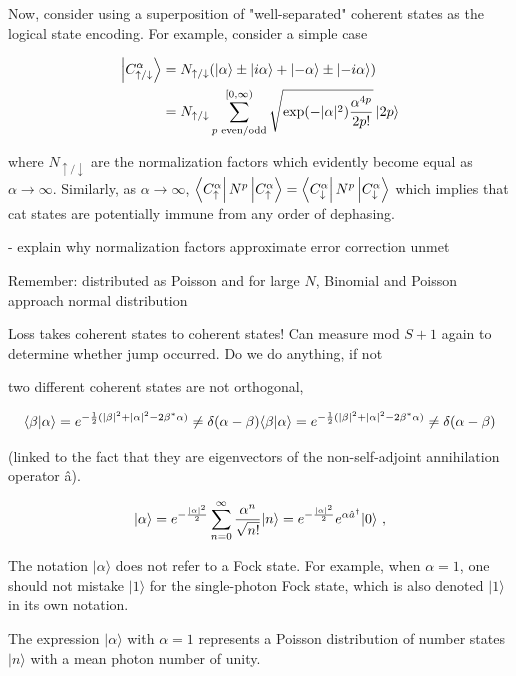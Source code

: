 \documentclass[12]{amsart}
\newcommand\0{\mathbf{0}}
\newcommand\<{\langle}
\renewcommand\>{\rangle}
\begin{document}
Now, consider using a superposition of "well-separated" coherent states as the logical state encoding. For example, consider a simple case

\begin{align*}
\ket{C^\alpha_{\uparrow/\downarrow}} &= N_{\uparrow /\downarrow} (\ket{\alpha} \pm \ket{i \alpha} + \ket{-\alpha} \pm \ket{-i \alpha}) \\
&= N_{\uparrow /\downarrow} \sum_{p\text{ even/odd}}^{[0, \infty)}\sqrt{\exp(-|\alpha|^2)\frac{
\alpha^{4p}}{2p!}}\ket{2p}
\end{align*}

where $N_{\uparrow /\downarrow}$ are the normalization factors which evidently become equal as $\alpha \rightarrow \infty$. Similarly, as $\alpha \rightarrow \infty$, $\bra{C^\alpha_{\uparrow}} N^p \ket{C^\alpha_{\uparrow}} = \bra{C^\alpha_{\downarrow}} N^p \ket{C^\alpha_{\downarrow}}$ which implies that cat states are potentially immune from any order of dephasing.

- explain why normalization factors approximate error correction unmet

Remember: distributed as Poisson and for large $N$, Binomial and Poisson approach normal distribution

Loss takes coherent states to coherent states! Can measure mod $S+1$ again to determine whether jump occurred. Do we do anything, if not


two different coherent states are not orthogonal,

$$
{\displaystyle \langle \beta |\alpha \rangle =e^{-{1 \over 2}(|\beta |^{2}+|\alpha |^{2}-2\beta ^{*}\alpha )}\neq \delta (\alpha -\beta )} \langle\beta|\alpha\rangle=e^{-{1\over2}(|\beta|^2+|\alpha|^2-2\beta^*\alpha)}\neq\delta(\alpha-\beta)
$$

(linked to the fact that they are eigenvectors of the non-self-adjoint annihilation operator â).

$$
|\alpha\rangle =e^{-{|\alpha|^2\over2}}\sum_{n=0}^{\infty}{\alpha^n\over\sqrt{n!}}|n\rangle =e^{-{|\alpha|^2\over2}}e^{\alpha\hat a^\dagger}|0\rangle ~,
$$

The notation ${\displaystyle |\alpha \rangle }$  does not refer to a Fock state. For example, when $\alpha = 1$, one should not mistake ${\displaystyle |1\rangle }$ for the single-photon Fock state, which is also denoted ${\displaystyle |1\rangle } $  in its own notation. 

The expression ${\displaystyle |\alpha \rangle } $  with $\alpha = 1$ represents a Poisson distribution of number states ${\displaystyle |n\rangle }$  with a mean photon number of unity.
\end{document}
